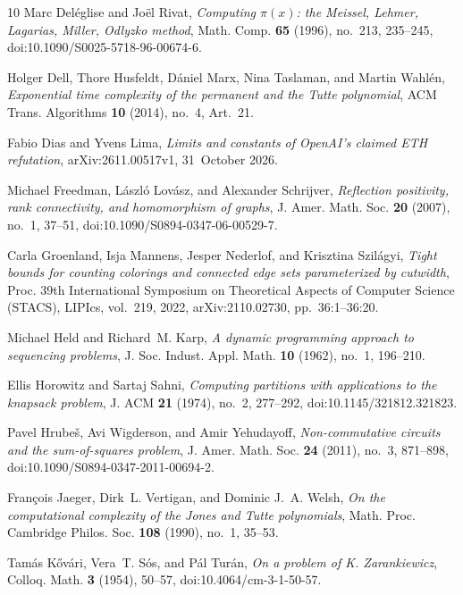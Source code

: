 \documentclass[10pt]{amsart}
\theoremstyle{plain}
\theoremstyle{definition}
\theoremstyle{remark}
\numberwithin{equation}{section}
\begin{document}
\begin{thebibliography}{10}
Marc Del{\'e}glise and Jo{\"e}l Rivat, \emph{Computing $\pi(x)$: the {M}eissel,
  {L}ehmer, {L}agarias, {M}iller, {O}dlyzko method}, Math. Comp. \textbf{65}
  (1996), no.~213, 235--245, doi:10.1090/S0025-5718-96-00674-6.

Holger Dell, Thore Husfeldt, D{\'a}niel Marx, Nina Taslaman, and Martin
  Wahl{\'e}n, \emph{Exponential time complexity of the permanent and the
  {T}utte polynomial}, ACM Trans. Algorithms \textbf{10} (2014), no.~4,
  Art.~21.

Fabio Dias and Yvens Lima, \emph{Limits and constants of {O}pen{AI}'s claimed
  {ETH} refutation}, arXiv:2611.00517v1, 31~October 2026.

Michael Freedman, L{\'a}szl{\'o} Lov{\'a}sz, and Alexander Schrijver,
  \emph{Reflection positivity, rank connectivity, and homomorphism of graphs},
  J. Amer. Math. Soc. \textbf{20} (2007), no.~1, 37--51,
  doi:10.1090/S0894-0347-06-00529-7.

Carla Groenland, Isja Mannens, Jesper Nederlof, and Krisztina Szil{\'a}gyi,
  \emph{Tight bounds for counting colorings and connected edge sets
  parameterized by cutwidth}, Proc. 39th International Symposium on
  Theoretical Aspects of Computer Science (STACS), LIPIcs, vol.~219, 2022,
  arXiv:2110.02730, pp.~36:1--36:20.

Michael Held and Richard~M. Karp, \emph{A dynamic programming approach to
  sequencing problems}, J. Soc. Indust. Appl. Math. \textbf{10} (1962), no.~1,
  196--210.

Ellis Horowitz and Sartaj Sahni, \emph{Computing partitions with applications
  to the knapsack problem}, J. ACM \textbf{21} (1974), no.~2, 277--292,
  doi:10.1145/321812.321823.

Pavel Hrube{\v{s}}, Avi Wigderson, and Amir Yehudayoff, \emph{Non-commutative
  circuits and the sum-of-squares problem}, J. Amer. Math. Soc. \textbf{24}
  (2011), no.~3, 871--898, doi:10.1090/S0894-0347-2011-00694-2.

Fran{\c{c}}ois Jaeger, Dirk~L. Vertigan, and Dominic J.~A. Welsh, \emph{On the
  computational complexity of the {J}ones and {T}utte polynomials}, Math. Proc.
  Cambridge Philos. Soc. \textbf{108} (1990), no.~1, 35--53.

Tam{\'a}s K{\H{o}}v{\'a}ri, Vera~T. S{\'o}s, and P{\'a}l Tur{\'a}n, \emph{On a
  problem of {K}. {Z}arankiewicz}, Colloq. Math. \textbf{3} (1954), 50--57,
  doi:10.4064/cm-3-1-50-57.


\end{thebibliography}
\end{document}
